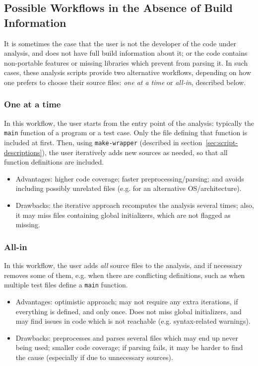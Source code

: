 \subsection{Possible Workflows in the Absence of Build Information}
\label{sec:alternative-workflows}

It is sometimes the case that the \FramaC user is not the developer of the
code under analysis, and does not have full build information about it;
or the code contains non-portable features or missing libraries which prevent
\FramaC from parsing it.
In such cases, these analysis scripts provide two alternative workflows,
depending on how one prefers to choose their source files:
{\em one at a time} or {\em all-in}, described below.

\subsubsection{One at a time}

In this workflow, the user starts from the entry point
of the analysis: typically the \texttt{main} function of a program or a test
case. Only the file defining that function is included at first. Then, using
\texttt{make-wrapper} (described in section~\ref{sec:script-descriptions}),
the user iteratively adds new sources as needed,
so that all function definitions are included.

\begin{itemize}
\item Advantages: higher code coverage; faster preprocessing/parsing; and
avoids including possibly unrelated files
(e.g. for an alternative OS/architecture).
\item Drawbacks: the iterative approach recomputes the analysis several times;
  also, it may miss files containing global initializers, which are not flagged
  as missing.
\end{itemize}

\subsubsection{All-in}

In this workflow, the user adds {\em all} source files to the analysis, and
if necessary removes some of them, e.g. when there are conflicting definitions,
such as when multiple test files define a \texttt{main} function.

\begin{itemize}
\item Advantages: optimistic approach; may not require any extra iterations, if
  everything is defined, and only once. Does not miss global initializers, and
  may find issues in code which is not reachable (e.g. syntax-related warnings).
\item Drawbacks: preprocesses and parses several files which may end up never
  being used; smaller code coverage; if parsing fails, it may be harder to
  find the cause (especially if due to unnecessary sources).
\end{itemize}

